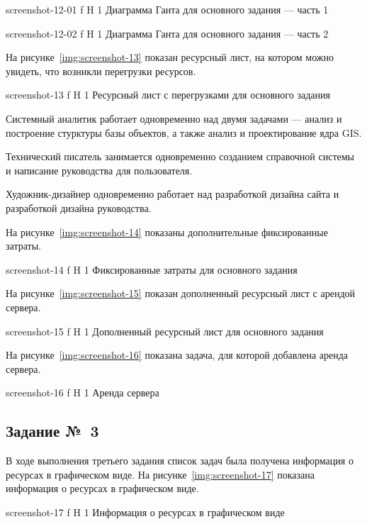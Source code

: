 \documentclass{bmstu}
\begin{document}
    {screenshot-12-01}
    {f}
    {H}
    {1\textwidth}
    {Диаграмма Ганта для основного задания --- часть 1}
    
    {screenshot-12-02}
    {f}
    {H}
    {1\textwidth}
    {Диаграмма Ганта для основного задания --- часть 2}
    
На рисунке~\ref{img:screenshot-13} показан ресурсный лист, на котором можно увидеть, что возникли перегрузки ресурсов.
    
    {screenshot-13}
    {f}
    {H}
    {1\textwidth}
    {Ресурсный лист с перегрузками для основного задания}
    
Системный аналитик работает одновременно над двумя задачами --- анализ и построение стурктуры базы объектов, а также анализ и проектирование ядра GIS.

Технический писатель занимается одновременно созданием справочной системы и написание руководства для пользователя.

Художник-дизайнер одновременно работает над разработкой дизайна сайта и разработкой дизайна руководства.

На рисунке~\ref{img:screenshot-14} показаны дополнительные фиксированные затраты.
    
    {screenshot-14}
    {f}
    {H}
    {1\textwidth}
    {Фиксированные затраты для основного задания}
    
На рисунке~\ref{img:screenshot-15} показан дополненный ресурсный лист с арендой сервера.
    
    {screenshot-15}
    {f}
    {H}
    {1\textwidth}
    {Дополненный ресурсный лист для основного задания}
    
На рисунке~\ref{img:screenshot-16} показана задача, для которой добавлена аренда сервера.
    
    {screenshot-16}
    {f}
    {H}
    {1\textwidth}
    {Аренда сервера}

\subsection{Задание №~3}

В ходе выполнения третьего задания список задач была получена информация о ресурсах в графическом виде. 
На рисунке~\ref{img:screenshot-17} показана информация о ресурсах в графическом виде.
    
    {screenshot-17}
    {f}
    {H}
    {1\textwidth}
    {Информация о ресурсах в графическом виде}
    
\end{document}
